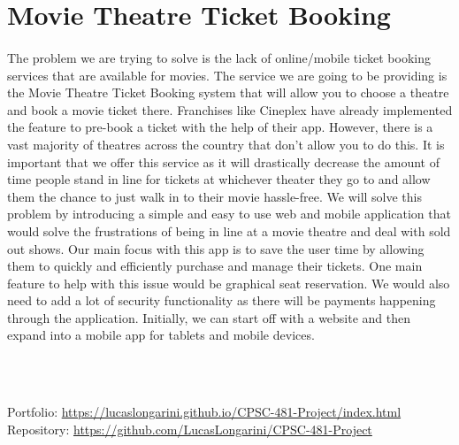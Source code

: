 \documentclass{article}
\begin{document}
\section{Movie Theatre Ticket Booking}
\paragraph{}
The problem we are trying to solve is the lack of online/mobile ticket booking services that are available for movies.
The service we are going to be providing is the Movie Theatre Ticket Booking system that will allow you to choose a theatre and book a movie ticket there.
Franchises like Cineplex have already implemented the feature to pre-book a ticket with the help of their app. However, there is a vast majority of theatres across the country that don’t allow you to do this.
It is important that we offer this service as it will drastically decrease the amount of time people stand in line for tickets at whichever theater they go to and allow them the chance to just walk in to their movie hassle-free.
We will solve this problem by introducing a simple and easy to use web and mobile application that would solve the frustrations of being in line at a movie theatre and deal with sold out shows.
Our main focus with this app is to save the user time by allowing them to quickly and efficiently purchase and manage their tickets. One main feature to help with this issue would be graphical seat reservation.
We would also need to add a lot of security functionality as there will be payments happening through the application. Initially,  we can start off with a website and then expand into a mobile app for tablets and mobile devices.

\\~\\

\begin{flushleft}  
Portfolio: \url{https://lucaslongarini.github.io/CPSC-481-Project/index.html}
\newline
Repository: \url{https://github.com/LucasLongarini/CPSC-481-Project}
\end{flushleft}  
\end{document}
